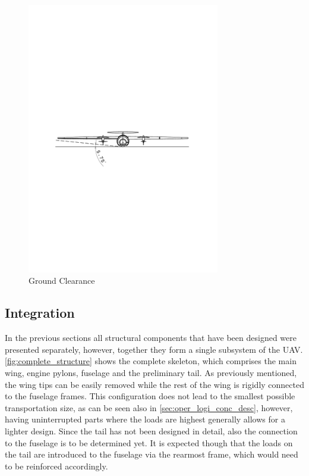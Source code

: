 \begin{figure}[H]
    \centering
    \includegraphics[width=0.75\textwidth]{Structures/Figures/ground_clearance}
    \caption{Ground Clearance}
    \label{fig:ground_clearance}
\end{figure}

\subsection{Integration}

In the previous sections all structural components that have been designed were presented separately, however, together they form a single subsystem of the UAV. \autoref{fig:complete_structure} shows the complete skeleton, which comprises the main wing, engine pylons, fuselage and the preliminary tail. As previously mentioned, the wing tips can be easily removed while the rest of the wing is rigidly connected to the fuselage frames. This configuration does not lead to the smallest possible transportation size, as can be seen also in \autoref{sec:oper_logi_conc_desc}, however, having uninterrupted parts where the loads are highest generally allows for a lighter design. Since the tail has not been designed in detail, also the connection to the fuselage is to be determined yet. It is expected though that the loads on the tail are introduced to the fuselage via the rearmost frame, which would need to be reinforced accordingly.



